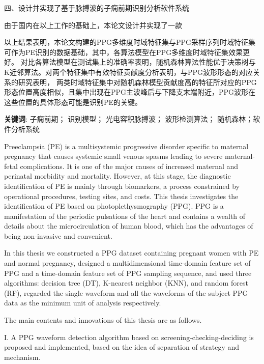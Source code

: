 四、设计并实现了基于脉搏波的子痫前期识别分析软件系统

由于国内在以上工作的基础上，本论文设计并实现了一款

以上结果表明，本论文构建的PPG多维度时域特征集与PPG采样序列时域特征集可作为PE识别的数据基础，其中，各算法模型在PPG多维度时域特征集效果更好。
对比各算法模型在测试集上的准确率表明，随机森林算法性能优于决策树与K近邻算法。对两个特征集中有效特征贡献度分析表明，与PPG波形形态的对应关系的研究表明，
两类时域特征集中对随机森林模型贡献度高的特征所对应的PPG形态位置高度相似，且集中出现在PPG主波峰后与下降支末端附近，PPG波形在这些位置的具体形态可能是识别PE的关键。

\vspace{2em}

\textbf{关键词}: 子痫前期； 识别模型； 光电容积脉搏波； 波形检测算法； 随机森林；软件分析系统


\cleardoublepage
{}

Preeclampsia (PE) is a multisystemic progressive disorder specific to maternal pregnancy that causes systemic small venous spasms 
leading to severe maternal-fetal complications. It is one of the major causes of increased maternal and perinatal morbidity and mortality.  
However, at this stage, the diagnostic identification of PE is mainly through biomarkers, a process constrained by operational procedures, 
testing sites, and costs. 
This thesis investigates the identification of PE based on photoplethysmography (PPG). PPG is a manifestation of the periodic pulsations 
of the heart and contains a wealth of details about the microcirculation of human blood, which has the advantages of being non-invasive and convenient.

In this thesis we constructed a PPG dataset containing pregnant women with PE and normal pregnancy, designed a multidimensional time-domain feature set of PPG and 
a time-domain feature set of PPG sampling sequence, and used three algorithms: decision tree (DT), K-nearest neighbor (KNN), and random forest (RF), 
regarded the single waveform and all the waveforms of the subject PPG data as the minimum unit of analysis respectively.

The main contents and innovations of this thesis are as follows.

I. A PPG waveform detection algorithm based on screening-checking-deciding is proposed and implemented, based on the idea of separation of strategy and mechanism.

